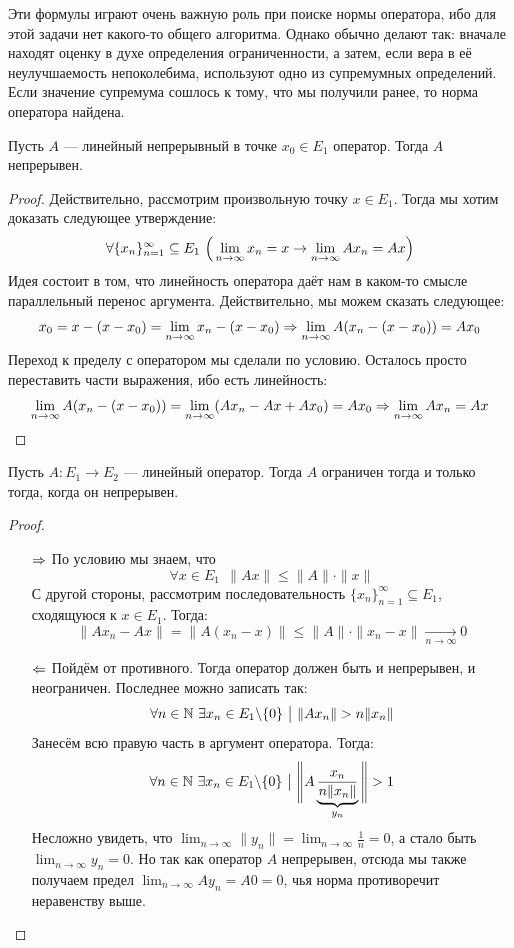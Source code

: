 \begin{note}
	Эти формулы играют очень важную роль при поиске нормы оператора, ибо для этой задачи нет какого-то общего алгоритма. Однако обычно делают так: вначале находят оценку в духе определения ограниченности, а затем, если вера в её неулучшаемость непоколебима, используют одно из супремумных определений. Если значение супремума сошлось к тому, что мы получили ранее, то норма оператора найдена.
\end{note}

\begin{proposition}
	Пусть $A$ --- линейный непрерывный в точке $x_0 \in E_1$ оператор. Тогда $A$ непрерывен.
\end{proposition}

\begin{proof}
	Действительно, рассмотрим произвольную точку $x \in E_1$. Тогда мы хотим доказать следующее утверждение:
	\[
		\forall \{x_n\}_{n = 1}^\infty \subseteq E_1\ \Big(\lim_{n \to \infty} x_n = x \ra \lim_{n \to \infty} Ax_n = Ax\Big)
	\]
	Идея состоит в том, что линейность оператора даёт нам в каком-то смысле параллельный перенос аргумента. Действительно, мы можем сказать следующее:
	\[
		x_0 = x - (x - x_0) = \lim_{n \to \infty} x_n - (x - x_0) \Rightarrow \lim_{n \to \infty} A(x_n - (x - x_0)) = Ax_0
	\]
	Переход к пределу с оператором мы сделали по условию. Осталось просто переставить части выражения, ибо есть линейность:
	\[
		\lim_{n \to \infty} A(x_n - (x - x_0)) = \lim_{n \to \infty} (Ax_n - Ax + Ax_0) = Ax_0 \Rightarrow \lim_{n \to \infty} Ax_n = Ax
	\]
\end{proof}

\begin{theorem}
	Пусть $A \colon E_1 \to E_2$ --- линейный оператор. Тогда $A$ ограничен тогда и только тогда, когда он непрерывен.
\end{theorem}

\begin{proof}~
	\begin{itemize}
		\item[$\Rightarrow$] По условию мы знаем, что
		\[
			\forall x \in E_1\ \ \|Ax\| \le \|A\| \cdot \|x\|
		\]
		С другой стороны, рассмотрим последовательность $\{x_n\}_{n = 1}^\infty \subseteq E_1$, сходящуюся к $x \in E_1$. Тогда:
		\[
			\|Ax_n - Ax\| = \|A(x_n - x)\| \le \|A\| \cdot \|x_n - x\| \xrightarrow[n \to \infty]{} 0
		\]
		
		\item[$\Leftarrow$] Пойдём от противного. Тогда оператор должен быть и непрерывен, и неограничен. Последнее можно записать так:
		\[
			\forall n \in \mathbb{N}\ \exists x_n \in E_1 \backslash \{0\} \ \big|\  \|Ax_n\| > n\|x_n\|
		\]
		Занесём всю правую часть в аргумент оператора. Тогда:
		\[
			\forall n \in \mathbb{N}\ \exists x_n \in E_1 \backslash \{0\} \ \big|\  \Bigg\|A\underbrace{\frac{x_n}{n\|x_n\|}}_{y_n}\Bigg\| > 1
		\]
		Несложно увидеть, что $\lim_{n \to \infty} \|y_n\| = \lim_{n \to \infty} \frac{1}{n} = 0$, а стало быть $\lim_{n \to \infty} y_n = 0$. Но так как оператор $A$ непрерывен, отсюда мы также получаем предел $\lim_{n \to \infty} Ay_n = A0 = 0$, чья норма противоречит неравенству выше.
	\end{itemize}
\end{proof}

